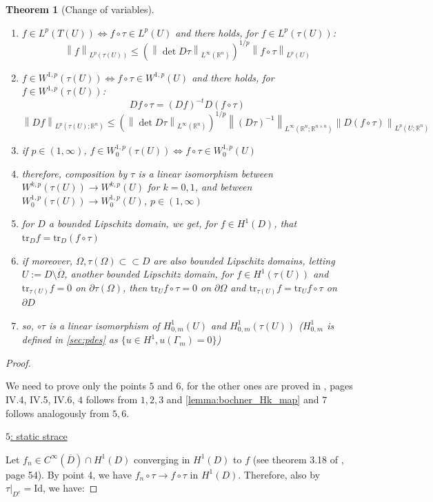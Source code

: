 \documentclass[english,a4paper,9pt,oneside]{scrbook}	%
\theoremstyle{break}
\newtheorem{thm}[equation]{Theorem}
\newenvironment{mproof}[1][\proofname]{%
  \begin{proof}[#1]$ $\par\nobreak\ignorespaces
}{%
  \end{proof}
}
\renewcommand*{\proofname}{Proof}
\theoremstyle{remark}
\newcommand{\mR}{\mathbb{R}}
\newcommand{\norm}[1]{\left\lVert#1\right\rVert}
\newcommand{\tr}{\text{tr}}
\newcommand{\cc}{\subset\subset}
\newcommand{\id}{\text{Id}}
\begin{document}
\begin{appendices}
\begin{thm}[Change of variables]
\begin{enumerate}
	\item $f \in L^p(T(U)) \iff f\circ \tau \in L^p(U)$ and there holds, for $f \in L^p(\tau(U))$:
	$$ \norm{f}_{L^p(\tau(U))}\leq \left ( \norm{\det D\tau}_{L^\infty(\mR^n)}\right)^{1/p} \norm{f\circ \tau}_{L^p(U)}$$
	\item $f \in W^{1,p}(\tau(U)) \iff f\circ \tau \in W^{1,p}(U)$ and there holds, for $f\in W^{1,p}(\tau(U))$:
	$$Df \circ \tau = (Df)^{-t}D(f\circ \tau)$$
	$$ \norm{Df}_{L^p(\tau(U);\mR^n)}\leq \left ( \norm{\det D\tau}_{L^\infty(\mR^n)}\right)^{1/p} \norm{(D\tau)^{-1}}_{L^\infty(\mR^n;\mR^{n\times n})}\norm{D(f\circ \tau)}_{L^p(U;\mR^n)}$$
	\item if $p \in (1, \infty)$, $f \in W^{1,p}_0(\tau(U)) \iff f\circ \tau \in W^{1,p}_0(U)$
	\item therefore, composition by $\tau$ is a linear isomorphism between $W^{k,p}(\tau(U))\rightarrow W^{k,p}(U)$ for $k=0,1$, and between $W^{1,p}_0(\tau(U))\rightarrow W^{1,p}_0(U)$, $p \in (1, \infty)$
	\item for $D$ a bounded Lipschitz domain, we get, for $f \in H^1(D)$, that $\tr_D f = \tr_D(f\circ \tau)$
	\item if moreover, $\Omega, \tau(\Omega) \cc D$ are also bounded Lipschitz domains, letting $U:=D\setminus \overline{\Omega}$, another bounded Lipschitz domain, for $f \in H^1(\tau(U))$ and $\tr_{\tau(U)} f =0 $ on $ \partial \tau(\Omega) $, then $\tr_{U} f\circ \tau=0$ on $\partial \Omega$ and $\tr_{\tau(U)} f = \tr_{U} f\circ \tau$ on $\partial D$
	\item so, $\circ \tau$ is a linear isomorphism of $H^1_{0,m}(U)$ and $H^1_{0,m}(\tau(U))$ ($H^1_{0,m}$ is defined in \cref{sec:pdes} as $\{u \in H^1, u(\Gamma_m)=0\}$)
\end{enumerate}

\end{thm}

\begin{mproof}

We need to prove only the points $5$ and $6$, for the other ones are proved in \cite{murat}, pages IV.4, IV.5, IV.6, $4$ follows from $1,2,3$ and \cref{lemma:bochner_Hk_map} and $7$ follows analogously from $5,6$.

\underline{$5$: static strace}

Let $f_n \in C^\infty(\overline{D})\cap H^1(D)$ converging in $H^1(D)$ to $f$ (see theorem 3.18 of \cite{adams}, page 54). By point 4, we have $f_n \circ \tau\rightarrow f\circ \tau$ in $H^1(D)$. Therefore, also by $\tau|_{D^c} = \id$, we have:


\end{mproof}
\end{appendices}
\end{document}
